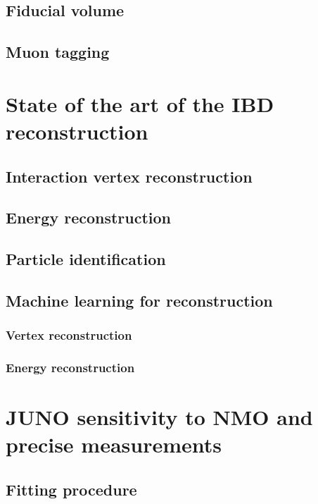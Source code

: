 
\subsection{Fiducial volume}

\subsection{Muon tagging}

\section{State of the art of the IBD reconstruction}

\subsection{Interaction vertex reconstruction}

\subsection{Energy reconstruction}

\subsection{Particle identification}

\subsection{Machine learning for reconstruction}

\subsubsection{Vertex reconstruction}

\subsubsection{Energy reconstruction}

\section{JUNO sensitivity to NMO and precise measurements}

\subsection{Fitting procedure}
